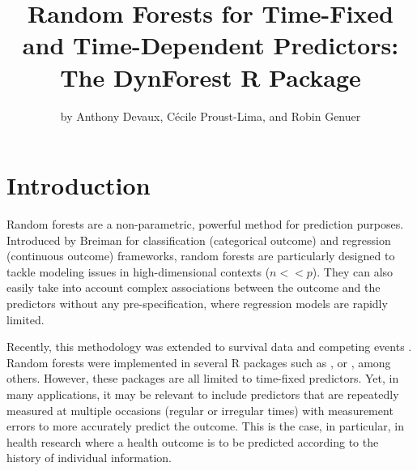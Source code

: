 \title{Random Forests for Time-Fixed and Time-Dependent Predictors: The DynForest R Package}


\author{by Anthony Devaux, Cécile Proust-Lima, and Robin Genuer}

\maketitle


\section{Introduction}\label{introduction}

Random forests are a non-parametric, powerful method for prediction purposes. Introduced by Breiman \citep{breiman_random_2001} for classification (categorical outcome) and regression (continuous outcome) frameworks, random forests are particularly designed to tackle modeling issues in high-dimensional contexts (\(n << p\)). They can also easily take into account complex associations between the outcome and the predictors without any pre-specification, where regression models are rapidly limited.

Recently, this methodology was extended to survival data \citep{ishwaran_random_2008} and competing events \citep{ishwaran_random_2014}. Random forests were implemented in several R \citep{R_2019} packages such as  \citep{ishwaran_fast_2022},  \citep{wright_ranger_2017} or  \citep{chen_xgboost_2016}, among others. However, these packages are all limited to time-fixed predictors. Yet, in many applications, it may be relevant to include predictors that are repeatedly measured at multiple occasions (regular or irregular times) with measurement errors to more accurately predict the outcome. This is the case, in particular, in health research where a health outcome is to be predicted according to the history of individual information.

